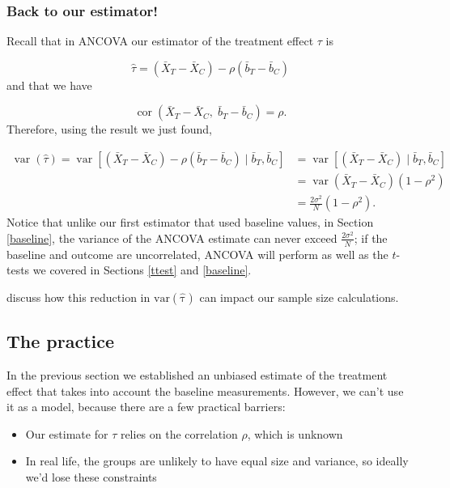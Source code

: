 \documentclass[
  openany]{book}
\providecommand{\tightlist}{%
  \setlength{\itemsep}{0pt}\setlength{\parskip}{0pt}}
\theoremstyle{definition}
\theoremstyle{definition}
\theoremstyle{definition}
\theoremstyle{definition}
\theoremstyle{remark}
\begin{document}
\subsubsection*{Back to our estimator!}\label{back-to-our-estimator}

Recall that in ANCOVA our estimator of the treatment effect \(\tau\) is

\[ \hat{\tau} = \left(\bar{X}_T - \bar{X}_C\right) - \rho\left(\bar{b}_T - \bar{b}_C\right)\]
and that we have

\[\operatorname{cor}\left(\bar{X}_T - \bar{X}_C,\; \bar{b}_T - \bar{b}_C\right) = \rho.\]
Therefore, using the result we just found,

\[
\begin{aligned}
\operatorname{var}\left(\hat{\tau}\right) = \operatorname{var}\left[\left(\bar{X}_T - \bar{X}_C\right) - \rho\left(\bar{b}_T - \bar{b}_C\right)\mid{\bar{b}_T,\bar{b}_C}\right] &= \operatorname{var}\left[\left(\bar{X}_T - \bar{X}_C\right) \mid{\bar{b}_T,\bar{b}_C}\right]\\
& = \operatorname{var}\left(\bar{X}_T - \bar{X}_C\right)\left(1-\rho^2\right)\\
& = \frac{2\sigma^2}{N}\left(1-\rho^2\right).
\end{aligned}
\]
Notice that unlike our first estimator that used baseline values, in Section \ref{baseline}, the variance of the ANCOVA estimate can never exceed \(\frac{2\sigma^2}{N}\); if the baseline and outcome are uncorrelated, ANCOVA will perform as well as the \(t\)-tests we covered in Sections \ref{ttest} and \ref{baseline}.

\citet{borm2007simple} discuss how this reduction in \(\operatorname{var\left(\hat{\tau}\right)}\) can impact our sample size calculations.

\subsection{The practice}\label{ancova-practice}

In the previous section we established an unbiased estimate of the treatment effect that takes into account the baseline measurements. However, we can't use it as a model, because there are a few practical barriers:

\begin{itemize}
\tightlist
\item
  Our estimate for \(\tau\) relies on the correlation \(\rho\), which is unknown
\item
  In real life, the groups are unlikely to have equal size and variance, so ideally we'd lose these constraints
\end{itemize}
\end{document}
